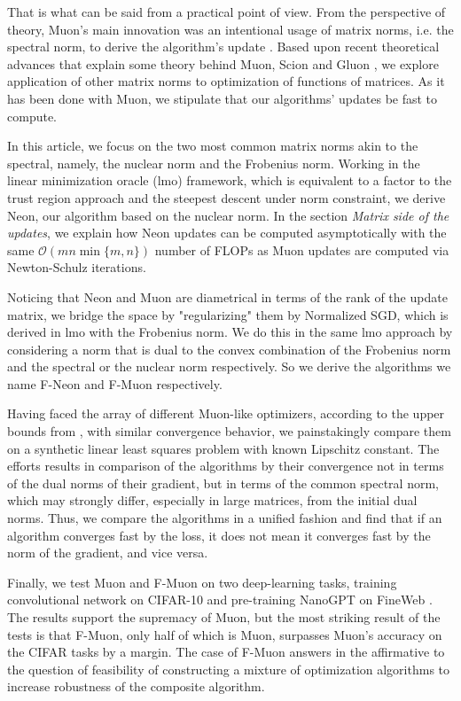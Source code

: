 \documentclass{article} %
\newcommand{\cO}{\mathcal{O}}
\begin{document}
 That is what can be said from a practical point of view. From the perspective of theory, Muon's main innovation was an intentional usage of matrix norms, i.e. the spectral norm, to derive the algorithm's update \citep{bernstein2025deriving}. Based upon recent theoretical advances that explain some theory behind Muon, Scion and Gluon \citep{bernstein2025deriving,kovalev2025understanding,pethick2025training,riabinin2025gluon}, we explore application of other matrix norms to optimization of functions of matrices. As it has been done with Muon, we stipulate that our algorithms' updates be fast to compute.

 In this article, we focus on the two most common matrix norms akin to the spectral, namely, the nuclear norm and the Frobenius norm. Working in the linear minimization oracle (lmo) framework, which is equivalent to a factor to the trust region approach and the steepest descent under norm constraint, we derive Neon, our algorithm based on the nuclear norm. In the section {\it Matrix side of the updates}, we explain how Neon updates can be computed asymptotically with the same $\cO(m n \min\{m, n\})$ number of FLOPs as Muon updates are computed via Newton-Schulz iterations.

 Noticing that Neon and Muon are diametrical in terms of the rank of the update matrix, we bridge the space by "regularizing" them by Normalized SGD, which is derived in lmo with the Frobenius norm. We do this in the same lmo approach by considering a norm that is dual to the convex combination of the Frobenius norm and the spectral or the nuclear norm respectively. So we derive the algorithms we name F-Neon and F-Muon respectively.


 Having faced the array of different Muon-like optimizers, according to the upper bounds from \citet{kovalev2025understanding,riabinin2025gluon}, with similar convergence behavior, we painstakingly compare them on a synthetic linear least squares problem with known Lipschitz constant. The efforts results in comparison of the algorithms by their convergence not in terms of the dual norms of their gradient, but in terms of the common spectral norm, which may strongly differ, especially in large matrices, from the initial dual norms. Thus, we compare the algorithms in a unified fashion and find that if an algorithm converges fast by the loss, it does not mean it converges fast by the norm of the gradient, and vice versa.

 Finally, we test Muon and F-Muon on two deep-learning tasks, training convolutional network on CIFAR-10 \citep{cifar2023airbench} and pre-training NanoGPT on FineWeb \citep{modded_nanogpt_2024}. The results support the supremacy of Muon, but the most striking result of the tests is that F-Muon, only half of which is Muon, surpasses Muon's accuracy on the CIFAR tasks by a margin. The case of F-Muon answers in the affirmative to the question of feasibility of constructing a mixture of optimization algorithms to increase robustness of the composite algorithm.
\end{document}
